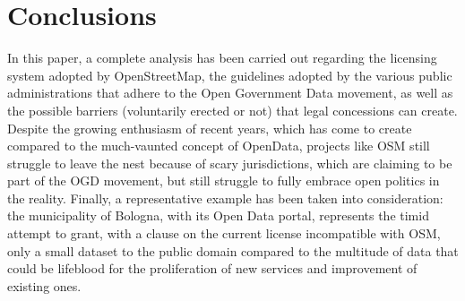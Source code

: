 \section{Conclusions}
In this paper, a complete analysis has been carried out regarding the licensing system adopted by OpenStreetMap, the guidelines adopted by the various public administrations that adhere to the Open Government Data movement, as well as the possible barriers (voluntarily erected or not) that legal concessions can create.
Despite the growing enthusiasm of recent years, which has come to create compared to the much-vaunted concept of OpenData, projects like OSM still struggle to leave the nest because of scary jurisdictions, which are claiming to be part of the OGD movement, but still struggle to fully embrace open politics in the reality.
Finally, a representative example has been taken into consideration: the municipality of Bologna, with its Open Data portal, represents the timid attempt to grant, with a clause on the current license incompatible with OSM, only a small dataset to the public domain compared to the multitude of data that could be lifeblood for the proliferation of new services and improvement of existing ones.